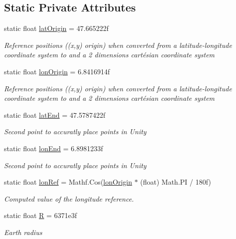 \subsection*{Static Private Attributes}
\begin{DoxyCompactItemize}
\item 
static float \hyperlink{classGraphInMap_aa8378e8c900bf9192e921b2050f4d2a4}{lat\+Origin} = 47.\+665222f
\begin{DoxyCompactList}\small\item\em Reference positions ((x,y) origin) when converted from a latitude-\/longitude coordinate system to and a 2 dimensions cartésian coordinate system \end{DoxyCompactList}\item 
static float \hyperlink{classGraphInMap_ad976da0443161f13f73a84661e148cd5}{lon\+Origin} = 6.\+8416914f
\begin{DoxyCompactList}\small\item\em Reference positions ((x,y) origin) when converted from a latitude-\/longitude coordinate system to and a 2 dimensions cartésian coordinate system \end{DoxyCompactList}\item 
static float \hyperlink{classGraphInMap_a069890e3bb1f0ca907507a6651704b32}{lat\+End} = 47.\+5787422f
\begin{DoxyCompactList}\small\item\em Second point to accuratly place points in Unity \end{DoxyCompactList}\item 
static float \hyperlink{classGraphInMap_a4e63761178f713380882e24c9314d882}{lon\+End} = 6.\+8981233f
\begin{DoxyCompactList}\small\item\em Second point to accuratly place points in Unity \end{DoxyCompactList}\item 
static float \hyperlink{classGraphInMap_a2781188e0f0f11ccff75ff0d07c7596d}{lon\+Ref} = Mathf.\+Cos(\hyperlink{classGraphInMap_ad976da0443161f13f73a84661e148cd5}{lon\+Origin} $\ast$ (float) Math.\+PI / 180f)
\begin{DoxyCompactList}\small\item\em Computed value of the longitude reference. \end{DoxyCompactList}\item 
static float \hyperlink{classGraphInMap_ae6baf9b727da8e55d0634912f4e32913}{R} = 6371e3f
\begin{DoxyCompactList}\small\item\em Earth radius\end{DoxyCompactList}\end{DoxyCompactItemize}


